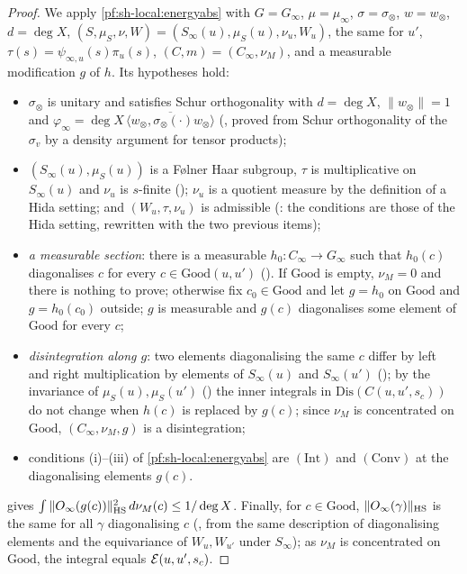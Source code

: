 \begin{proof}
We apply \cref{pf:sh-local:energyabs} with $G=G_\infty$, $\mu=\mu_\infty$, $\sigma=\sigma_\otimes$, $w=w_\otimes$,
$d=\deg X$, $(S,\mu_S,\nu,W)=(S_\infty(u),\mu_S(u),\nu_u,W_u)$, the same for $u'$,
$\tau(s)=\psi_{\infty,u}(s)\pi_u(s)$, $(C,m)=(C_\infty,\nu_M)$, and a measurable modification $g$ of $h$. Its
hypotheses hold:
\begin{itemize}
\item $\sigma_\otimes$ is unitary and satisfies Schur orthogonality with $d=\deg X$, $\|w_\otimes\|=1$ and
$\varphi_\infty=\deg X\,\overline{\langle w_\otimes,\sigma_\otimes(\cdot)w_\otimes\rangle}$
(, proved from Schur orthogonality of the $\sigma_v$ by a
density argument for tensor products);
\item $(S_\infty(u),\mu_S(u))$ is a F\o lner Haar subgroup, $\tau$ is multiplicative on $S_\infty(u)$ and $\nu_u$
is $s$-finite (); $\nu_u$ is a quotient measure by the
definition of a Hida setting; and $(W_u,\tau,\nu_u)$ is admissible
(: the conditions are those of the Hida setting, rewritten
with the two previous items);
\item \emph{a measurable section}: there is a measurable $h_0:C_\infty\to G_\infty$ such that $h_0(c)$ diagonalises
$c$ for every $c\in\mathrm{Good}(u,u')$ (). If $\mathrm{Good}$
is empty, $\nu_M=0$ and there is nothing to prove; otherwise fix $c_0\in\mathrm{Good}$ and let $g=h_0$ on
$\mathrm{Good}$ and $g=h_0(c_0)$ outside; $g$ is measurable and $g(c)$ diagonalises some element of $\mathrm{Good}$
for every $c$;
\item \emph{disintegration along $g$}: two elements diagonalising the same $c$ differ by left and right
multiplication by elements of $S_\infty(u)$ and $S_\infty(u')$
(); by the invariance of
$\mu_S(u),\mu_S(u')$ () the inner integrals in
$\mathrm{Dis}(C(u,u',s_c))$ do not change when $h(c)$ is replaced by $g(c)$; since $\nu_M$ is concentrated on
$\mathrm{Good}$, $(C_\infty,\nu_M,g)$ is a disintegration;
\item conditions (i)--(iii) of \cref{pf:sh-local:energyabs} are $(\mathrm{Int})$ and $(\mathrm{Conv})$ at the
diagonalising elements $g(c)$.
\end{itemize}
 gives $\int\|O_\infty(g(c))\|_{\mathrm{HS}}^2\,d\nu_M(c)\le1/\deg X$. Finally, for
$c\in\mathrm{Good}$, $\|O_\infty(\gamma)\|_{\mathrm{HS}}$ is the same for all $\gamma$ diagonalising $c$
(, from the same description of diagonalising elements and
the equivariance of $W_u,W_{u'}$ under $S_\infty$); as $\nu_M$ is concentrated on $\mathrm{Good}$, the integral equals
$\mathcal{E}(u,u',s_c)$.
\end{proof}

